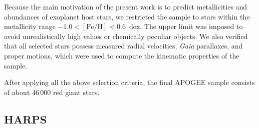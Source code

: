 \documentclass{aa}
\begin{document}
\begin{appendix}
Because the main motivation of the present work is to predict metallicities and abundances of exoplanet host stars, we restricted the sample to stars within the metallicity range $-1.0 < [\mathrm{Fe/H}] < 0.6$~dex. The upper limit was imposed to avoid unrealistically high values or chemically peculiar objects. We also verified that all selected stars possess measured radial velocities, \textit{Gaia} parallaxes, and proper motions, which were used to compute the kinematic properties of the sample.

After applying all the above selection criteria, the final APOGEE sample consists of about 46\,000 red giant stars.







\subsection{HARPS}


\end{appendix}
\end{document}
